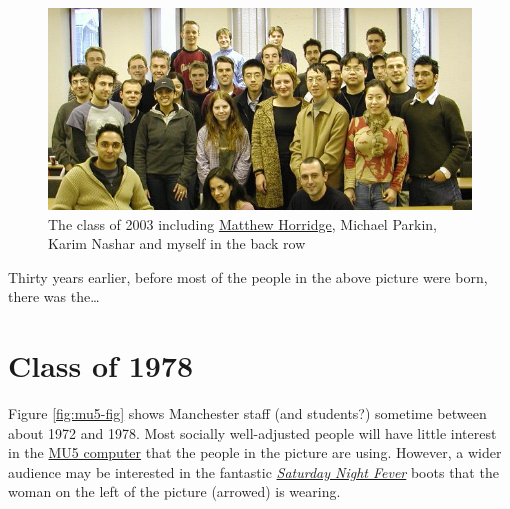 \documentclass[
  12pt,
]{book}
\begin{document}
\begin{figure}

{\centering \includegraphics[width=1\linewidth]{images/msc-2003} 

}

\caption{The class of 2003 including \href{https://web.stanford.edu/~horridge/}{Matthew Horridge}, Michael Parkin, Karim Nashar and myself in the back row}\label{fig:msc-fig}
\end{figure}



Thirty years earlier, before most of the people in the above picture were born, there was the\ldots{}

\hypertarget{y1978}{%
\section{Class of 1978}\label{y1978}}

Figure \ref{fig:mu5-fig} shows Manchester staff (and students?) sometime between about 1972 and 1978. Most socially well-adjusted people will have little interest in the \href{https://en.wikipedia.org/wiki/Manchester_computers\#MU5}{MU5 computer} that the people in the picture are using. However, a wider audience may be interested in the fantastic \emph{\href{https://en.wikipedia.org/wiki/Saturday_Night_Fever}{Saturday Night Fever}} boots that the woman on the left of the picture (arrowed) is wearing.
\end{document}
